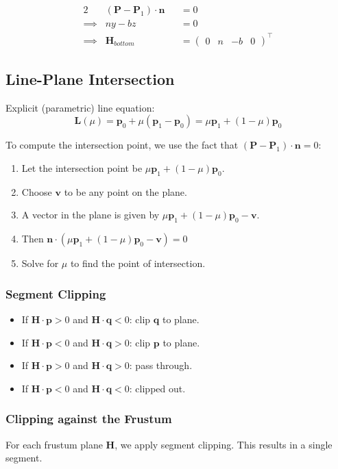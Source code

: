 \documentclass[11pt]{article}
\begin{document}
\begin{alignat*}{2}
  \quad & (\bm{P} - \bm{P}_1) \cdot \bm{n} &&= 0 \\
  \implies & ny - bz &&= 0 \\
  \implies & \bm{H}_{bottom} &&= \begin{pmatrix} 0 & n & -b & 0 \end{pmatrix}^\intercal
\end{alignat*}

\subsection{Line-Plane Intersection}
Explicit (parametric) line equation:
\[
  \bm{L}(\mu) = \bm{p}_0 + \mu(\bm{p}_1 - \bm{p}_0) = \mu \bm{p}_1 + (1 - \mu) \bm{p}_0
\]

To compute the intersection point, we use the fact that $(\bm{P} - \bm{P}_1) \cdot \bm{n} = 0$:
\begin{enumerate}
  \item Let the intersection point be $\mu \bm{p}_1 + (1 - \mu) \bm{p}_0$.
  \item Choose $\bm{v}$ to be any point on the plane.
  \item A vector in the plane is given by $\mu \bm{p}_1 + (1 - \mu) \bm{p}_0 - \bm{v}$.
  \item Then $\bm{n} \cdot (\mu \bm{p}_1 + (1 - \mu) \bm{p}_0 - \bm{v}) = 0$
  \item Solve for $\mu$ to find the point of intersection.
\end{enumerate}

\subsubsection{Segment Clipping}
\begin{itemize}
  \item If $\bm{H} \cdot \bm{p} > 0$ and $\bm{H} \cdot \bm{q} < 0$: clip $\bm{q}$ to plane.
  \item If $\bm{H} \cdot \bm{p} < 0$ and $\bm{H} \cdot \bm{q} > 0$: clip $\bm{p}$ to plane.
  \item If $\bm{H} \cdot \bm{p} > 0$ and $\bm{H} \cdot \bm{q} > 0$: pass through.
  \item If $\bm{H} \cdot \bm{p} < 0$ and $\bm{H} \cdot \bm{q} < 0$: clipped out.
\end{itemize}

\subsubsection{Clipping against the Frustum}
For each frustum plane $\bm{H}$, we apply segment clipping.
This results in a single segment.
\end{document}
